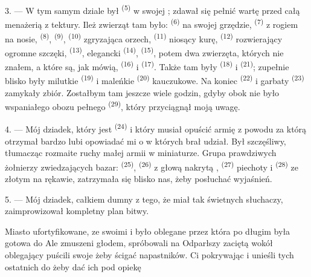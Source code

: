 3. --- W tym samym dziale był  \textsuperscript{(5)} w swojej
; zdawał się pełnić wartę przed całą menażerią z tektury. Ileż zwierząt
tam było:  \textsuperscript{(6)} na swojej grzędzie, 
\textsuperscript{(7)} z rogiem na nosie,  \textsuperscript{(8)},
 \textsuperscript{(9)},  \textsuperscript{(10)} zgryzająca
orzech,  \textsuperscript{(11)} niosący kurę, 
\textsuperscript{(12)} rozwierający ogromne szczęki, 
\textsuperscript{(13)}, elegancki  \textsuperscript{(14)},
 \textsuperscript{(15)}, potem dwa zwierzęta, których nie znałem, a
które są, jak mówią,  \textsuperscript{(16)} i 
\textsuperscript{(17)}. Także tam były  \textsuperscript{(18)} i
 \textsuperscript{(21)}; zupełnie blisko były milutkie 
\textsuperscript{(19)} i maleńkie  \textsuperscript{(20)} kauczukowe. Na
koniec  \textsuperscript{(22)} i garbaty 
\textsuperscript{(23)} zamykały zbiór. Zostałbym tam jeszcze wiele godzin, gdyby obok
nie było wspaniałego obozu pełnego 
\textsuperscript{(29)}, który przyciągnął moją uwagę.

\VUsaut{4.0mm}
\VUsaut{2.8mm}

4. --- Mój dziadek, który jest  \textsuperscript{(24)} i który musiał
opuścić armię z powodu  za którą otrzymał  bardzo
lubi opowiadać mi o  w których brał udział. Był szczęśliwy,
tłumacząc rozmaite ruchy małej armii w miniaturze. Grupa prawdziwych żołnierzy
zwiedzających bazar:  \textsuperscript{(25)}, 
\textsuperscript{(26)} z głową nakrytą , 
\textsuperscript{(27)} piechoty i  \textsuperscript{(28)} ze
złotym  na rękawie, zatrzymała się blisko nas, żeby posłuchać wyjaśnień.

5. --- Mój dziadek, całkiem dumny z tego, że miał tak świetnych słuchaczy,
zaimprowizował kompletny plan bitwy.

Miasto ufortyfikowane, ze swoimi  i  było oblegane przez
 która po długim  była gotowa do
 Ale  zmuszeni głodem, spróbowali  na
  Odparłszy  zaciętą 
wokół   oblegający puścili swoje
 żeby ścigać  napastników. Ci  pokrywając   i 
 unieśli tych ostatnich do  żeby dać ich pod opiekę

